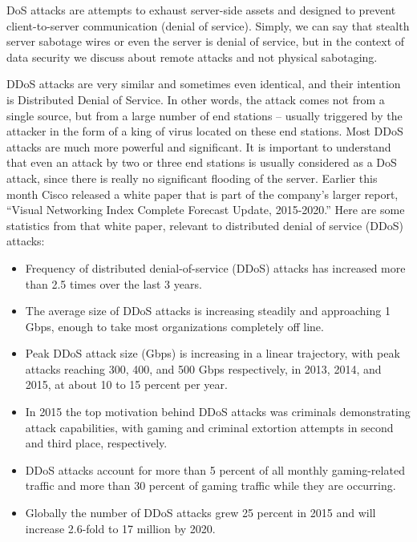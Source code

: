 \documentclass{report}
\begin{document}
\hfill \break DoS attacks are attempts to exhaust server-side assets and designed to prevent client-to-server communication (denial of service). Simply, we can say that stealth server sabotage wires or even the server is denial of service, but in the context of data security we discuss about remote attacks and not physical sabotaging.

\hfill \break DDoS attacks are very similar and sometimes even identical, and their intention is Distributed Denial of Service. In other words, the attack comes not from a single source, but from a large number of end stations – usually triggered by the attacker in the form of a king of virus located on these end stations. Most DDoS attacks are much more powerful and significant. It is important to understand that even an attack by two or three end stations is usually considered as a DoS attack, since there is really no significant flooding of the server.
\hfill \break Earlier this month Cisco released a white paper that is part of the company’s larger report, “Visual Networking Index Complete Forecast Update, 2015-2020.” Here are some statistics from that white paper, relevant to distributed denial of service (DDoS) attacks:
\begin{itemize}
\item Frequency of distributed denial-of-service (DDoS) attacks has increased more than 2.5 times over the last 3 years.
\item	The average size of DDoS attacks is increasing steadily and approaching 1 Gbps, enough to take most organizations completely off line.
\item	Peak DDoS attack size (Gbps) is increasing in a linear trajectory, with peak attacks reaching 300, 400, and 500 Gbps respectively, in 2013, 2014, and 2015, at about 10 to 15 percent per year.
\item	In 2015 the top motivation behind DDoS attacks was criminals demonstrating attack capabilities, with gaming and criminal extortion attempts in second and third place, respectively.
\item	DDoS attacks account for more than 5 percent of all monthly gaming-related traffic and more than 30 percent of gaming traffic while they are occurring.
\item	Globally the number of DDoS attacks grew 25 percent in 2015 and will increase 2.6-fold to 17 million by 2020.
\end{itemize}
\end{document}
